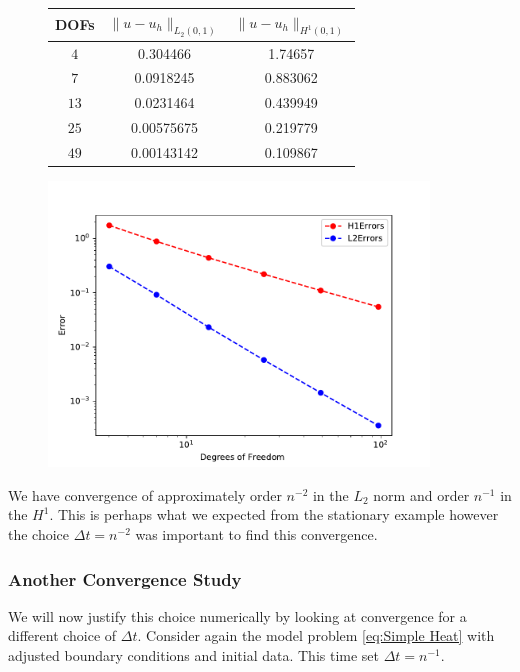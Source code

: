 \documentclass{uonmathreport}
\theoremstyle{definition}
\theoremstyle{problem}
\theoremstyle{theorem}
\begin{document}
\begin{figure}[h!]
\begin{minipage}{0.48\hsize}
\begin{tabular}{ccc}
    \hline
 DOFs & $\|u-u_h\|_{L_2(0,1)}$  & $\|u-u_h\|_{H^1(0,1)}$  \\ \hline
 $4$ & 0.304466 & 1.74657   \\
$7$ & 0.0918245 & 0.883062  \\
$13$ & 0.0231464 & 0.439949  \\
$25$ & 0.00575675 & 0.219779 \\
$49$ & 0.00143142 & 0.109867  \\
 \end{tabular}
  \end{minipage}
  \hfill
    \begin{minipage}{0.48\hsize}
  \includegraphics[width=0.9\textwidth]{ParabolicConvergencesOriginal.pdf}
  \label{fig:c}
\end{minipage}
    \end{figure}

We have convergence of approximately order $n^{-2}$ in the $L_2$ norm and order $n^{-1}$ in the $H^1$. This is perhaps what we expected from the stationary example however the choice $\Delta t = n^{-2} $ was important to find this convergence.


\subsubsection{Another Convergence Study} \label{subsec:convegence2}

 We will now justify this choice numerically by looking at convergence for a different choice of $\Delta t$. Consider again the model problem \ref{eq:Simple Heat} with adjusted boundary conditions and initial data. This time set $\Delta t = n^{-1} $.
\end{document}

